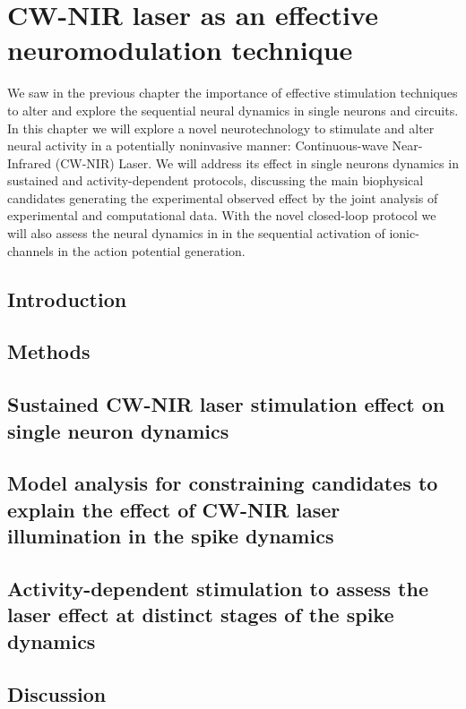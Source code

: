 \chapter{CW-NIR laser as an effective neuromodulation technique}
\label{c-laser}

We saw in the previous chapter the importance of effective stimulation techniques to alter and explore the sequential neural dynamics in single neurons and circuits. In this chapter we will explore a novel neurotechnology to stimulate and alter neural activity in a potentially noninvasive manner: Continuous-wave Near-Infrared (CW-NIR) Laser. We will address its effect in single neurons dynamics in sustained and activity-dependent protocols, discussing the main biophysical candidates generating the experimental observed effect by the joint analysis of experimental and computational data. With the novel closed-loop protocol we will also assess the neural dynamics in in the sequential activation of ionic-channels in the action potential generation. 

\section{Introduction}
\label{sect:intro} 



\section{Methods}



\section{Sustained CW-NIR laser stimulation effect on single neuron dynamics}
\label{sec:sustained effect}


\section{Model analysis for constraining candidates to explain the effect of CW-NIR laser illumination in the spike dynamics}
\label{sec:laser models}


\section{Activity-dependent stimulation to assess the laser effect at distinct stages of the spike dynamics} 
\label{sec:activity dependent}



\section{Discussion}
